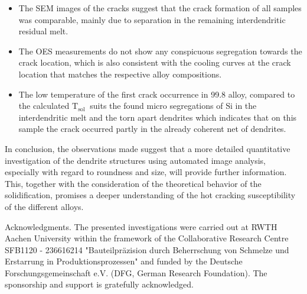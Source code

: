 \documentclass[10pt]{article}
\begin{document}
\begin{itemize}
  \item The SEM images of the cracks suggest that the crack formation of all samples was comparable, mainly due to separation in the remaining interdendritic residual melt.

  \item The OES measurements do not show any conspicuous segregation towards the crack location, which is also consistent with the cooling curves at the crack location that matches the respective alloy compositions.

  \item The low temperature of the first crack occurrence in 99.8 alloy, compared to the calculated $\mathrm{T}_{\text {sol }}$ suits the found micro segregations of $\mathrm{Si}$ in the interdendritic melt and the torn apart dendrites which indicates that on this sample the crack occurred partly in the already coherent net of dendrites.

\end{itemize}

In conclusion, the observations made suggest that a more detailed quantitative investigation of the dendrite structures using automated image analysis, especially with regard to roundness and size, will provide further information. This, together with the consideration of the theoretical behavior of the solidification, promises a deeper understanding of the hot cracking susceptibility of the different alloys.

Acknowledgments. The presented investigations were carried out at RWTH Aachen University within the framework of the Collaborative Research Centre SFB1120 - 236616214 "Bauteilpräzision durch Beherrschung von Schmelze und Erstarrung in Produktionsprozessen" and funded by the Deutsche Forschungsgemeinschaft e.V. (DFG, German Research Foundation). The sponsorship and support is gratefully acknowledged.
\end{document}
